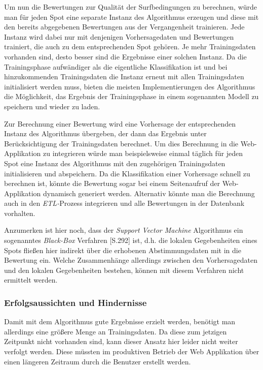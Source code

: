 Um nun die Bewertungen zur Qualität der Surfbedingungen zu berechnen,
würde man für jeden Spot eine separate Instanz des Algorithmus
erzeugen und diese mit den bereits abgegebenen Bewertungen aus der
Vergangenheit trainieren. Jede Instanz wird dabei nur mit denjenigen
Vorhersagedaten und Bewertungen trainiert, die auch zu dem
entsprechenden Spot gehören. Je mehr Trainingsdaten vorhanden sind,
desto besser sind die Ergebnisse einer solchen Instanz. Da die
Trainingsphase aufwändiger als die eigentliche Klassifikation ist und
bei hinzukommenden Trainingsdaten die Instanz erneut mit allen
Trainingsdaten initialisiert werden muss, bieten die meisten
Implementierungen des Algorithmus die Möglichkeit, das Ergebnis der
Trainingsphase in einem sogenannten Modell zu speichern und wieder zu
laden.

Zur Berechnung einer Bewertung wird eine Vorhersage der entsprechenden
Instanz des Algorithmus übergeben, der dann das Ergebnis unter
Berücksichtigung der Trainingsdaten berechnet. Um dies Berechnung in
die Web-Applikation zu integrieren würde man beispielsweise einmal
täglich für jeden Spot eine Instanz des Algorithmus mit den
zugehörigen Trainingsdaten initialisieren und abspeichern. Da die
Klassifikation einer Vorhersage schnell zu berechnen ist, könnte die
Bewertung sogar bei einem Seitenaufruf der Web-Applikation dynamisch
generiert werden. Alternativ könnte man die Berechnung auch in den
\textit{ETL-}Prozess integrieren und alle Bewertungen in der Datenbank
vorhalten.

Anzumerken ist hier noch, dass der \textit{Support Vector Machine}
Algorithmus ein sogenanntes \textit{Black-Box} Verfahren
\cite{Seagaran2007}[S.292] ist, d.h. die lokalen Gegebenheiten eines
Spots fließen hier indirekt über die erhobenen Abstimmungsdaten mit in
die Bewertung ein. Welche Zusammenhänge allerdings zwischen den
Vorhersagedaten und den lokalen Gegebenheiten bestehen, können mit
diesem Verfahren nicht ermittelt werden.

\subsubsection{Erfolgsaussichten und Hindernisse}
Damit mit dem Algorithmus gute Ergebnisse erzielt werden, benötigt man
allerdings eine größere Menge an Trainingsdaten. Da diese zum jetzigen
Zeitpunkt nicht vorhanden sind, kann dieser Ansatz hier leider nicht
weiter verfolgt werden. Diese müssten im produktiven Betrieb der Web
Applikation über einen längeren Zeitraum durch die Benutzer erstellt
werden.

